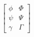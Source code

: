 \documentclass{sample}
\begin{document}
\[
    \left[
    \begin{array}{rr}
        \phi & \Phi\\
        \psi & \Psi\\
        \gamma & \Gamma
    \end{array}
    \right]
\]
\end{document}
